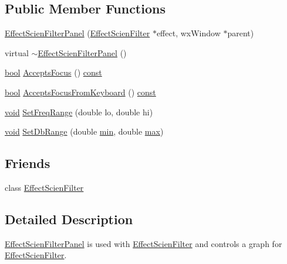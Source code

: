 \subsection*{Public Member Functions}
\begin{DoxyCompactItemize}
\item 
\hyperlink{class_effect_scien_filter_panel_a551f8bf18b901b20f61c1fc5cdb9a743}{Effect\+Scien\+Filter\+Panel} (\hyperlink{class_effect_scien_filter}{Effect\+Scien\+Filter} $\ast$effect, wx\+Window $\ast$parent)
\item 
virtual \hyperlink{class_effect_scien_filter_panel_a492fe37f2420afc43a4c18c35c63ee10}{$\sim$\+Effect\+Scien\+Filter\+Panel} ()
\item 
\hyperlink{mac_2config_2i386_2lib-src_2libsoxr_2soxr-config_8h_abb452686968e48b67397da5f97445f5b}{bool} \hyperlink{class_effect_scien_filter_panel_aeb9485e0a36057a12b1576ed0455bf66}{Accepts\+Focus} () \hyperlink{getopt1_8c_a2c212835823e3c54a8ab6d95c652660e}{const} 
\item 
\hyperlink{mac_2config_2i386_2lib-src_2libsoxr_2soxr-config_8h_abb452686968e48b67397da5f97445f5b}{bool} \hyperlink{class_effect_scien_filter_panel_a6eb964525625376c34d5a176f4079a02}{Accepts\+Focus\+From\+Keyboard} () \hyperlink{getopt1_8c_a2c212835823e3c54a8ab6d95c652660e}{const} 
\item 
\hyperlink{sound_8c_ae35f5844602719cf66324f4de2a658b3}{void} \hyperlink{class_effect_scien_filter_panel_ae22ab4ee0c6ff3dd207c8514eb03eb19}{Set\+Freq\+Range} (double lo, double hi)
\item 
\hyperlink{sound_8c_ae35f5844602719cf66324f4de2a658b3}{void} \hyperlink{class_effect_scien_filter_panel_a661a6eff830adb82f35064587256f9c8}{Set\+Db\+Range} (double \hyperlink{_compare_audio_command_8cpp_abd8bbcfabb3ddef2ccaafb9928a37b95}{min}, double \hyperlink{_t_d_stretch_8cpp_ac39d9cef6a5e030ba8d9e11121054268}{max})
\end{DoxyCompactItemize}
\subsection*{Friends}
\begin{DoxyCompactItemize}
\item 
class \hyperlink{class_effect_scien_filter_panel_aa4cba806dfe9ffe121640ecb3c18167f}{Effect\+Scien\+Filter}
\end{DoxyCompactItemize}


\subsection{Detailed Description}
\hyperlink{class_effect_scien_filter_panel}{Effect\+Scien\+Filter\+Panel} is used with \hyperlink{class_effect_scien_filter}{Effect\+Scien\+Filter} and controls a graph for \hyperlink{class_effect_scien_filter}{Effect\+Scien\+Filter}. 

